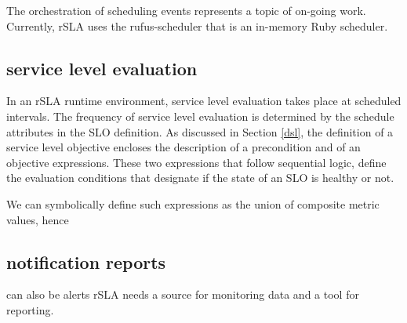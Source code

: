 The orchestration of scheduling events represents a topic of on-going work. Currently, rSLA uses the rufus-scheduler that is an in-memory Ruby scheduler. 

\subsection{service level evaluation}

In an rSLA runtime environment, service level evaluation takes place at scheduled intervals. The frequency of service level evaluation is determined by the schedule attributes in the SLO definition. As discussed in Section \ref{dsl}, the definition of a service level objective encloses the description of a precondition and of an objective expressions. These two expressions that follow sequential logic, define the evaluation conditions that designate if the state of an SLO is healthy or not.

We can symbolically define such expressions as the union of composite metric values, hence 


\subsection{notification reports}
can also be alerts
rSLA needs a source for monitoring data and a tool for reporting.